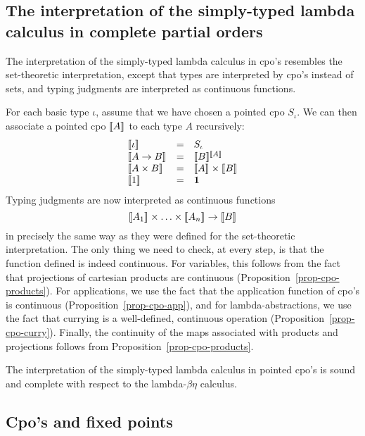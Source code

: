 \documentclass{article}
\begin{document}
\subsection{The interpretation of the simply-typed lambda calculus in
  complete partial orders}\label{subsec-cpo-interp}

The interpretation of the simply-typed lambda calculus in cpo's
resembles the set-theoretic interpretation, except that types are
interpreted by cpo's instead of sets, and typing judgments are
interpreted as continuous functions.

For each basic type $\iota$, assume that we have chosen a pointed cpo
$S_{\iota}$. We can then associate a pointed cpo $[\![A]\!]_{}$ to each
type $A$ recursively:
\[ \begin{array}{lll}
  \semm{\iota} &=& S_{\iota} \\
  \semm{A\to B} &=& \semm{B}^{\semm{A}} \\
  \semm{A\times B} &=& \semm{A}\times\semm{B} \\
  \semm{1} &=& {\bf 1}
\end{array}
\]
Typing judgments are now interpreted as continuous functions
\[     [\![A_1]\!]_{}\times\ldots\times[\![A_n]\!]_{} \to [\![B]\!]_{}
\]
in precisely the same way as they were defined for the set-theoretic
interpretation. The only thing we need to check, at every step, is
that the function defined is indeed continuous. For variables, this
follows from the fact that projections of cartesian products are
continuous (Proposition~\ref{prop-cpo-products}). For applications, we
use the fact that the application function of cpo's is continuous
(Proposition~\ref{prop-cpo-app}), and for lambda-abstractions, we use
the fact that currying is a well-defined, continuous operation
(Proposition~\ref{prop-cpo-curry}). Finally, the continuity of the
maps associated with products and projections follows from
Proposition~\ref{prop-cpo-products}.

\begin{proposition}
  The interpretation of the simply-typed lambda calculus in pointed
  cpo's is sound and complete with respect to the lambda-$\beta\eta$
  calculus.
\end{proposition}

\subsection{Cpo's and fixed points}
\end{document}

